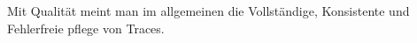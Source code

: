 
Mit Qualität meint man im allgemeinen die Vollständige, Konsistente und Fehlerfreie pflege von Traces.






